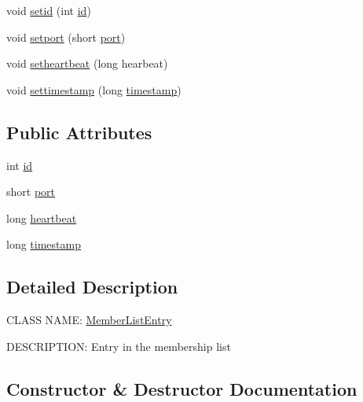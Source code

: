 \begin{DoxyCompactItemize}
\item 
void \hyperlink{class_member_list_entry_a7f5a04a841d491ef763cea6044a09ac1}{setid} (int \hyperlink{class_member_list_entry_a569594f798c011bec978d7de9af9e87c}{id})
\item 
void \hyperlink{class_member_list_entry_a4fd316a274905e869f091ac7cf384d7b}{setport} (short \hyperlink{class_member_list_entry_ae85ba26966dc188c7fec4c298fb47a81}{port})
\item 
void \hyperlink{class_member_list_entry_a08de1a1497e8930ddf823ba44f2a4d06}{setheartbeat} (long hearbeat)
\item 
void \hyperlink{class_member_list_entry_a963926fcfbe441fa4ddb1963ddff822d}{settimestamp} (long \hyperlink{class_member_list_entry_ae15f1e7b93b9f19be264930c783615cc}{timestamp})
\end{DoxyCompactItemize}
\subsection*{Public Attributes}
\begin{DoxyCompactItemize}
\item 
int \hyperlink{class_member_list_entry_a569594f798c011bec978d7de9af9e87c}{id}
\item 
short \hyperlink{class_member_list_entry_ae85ba26966dc188c7fec4c298fb47a81}{port}
\item 
long \hyperlink{class_member_list_entry_ae01ac985a9a529b0046bc463e97b9a52}{heartbeat}
\item 
long \hyperlink{class_member_list_entry_ae15f1e7b93b9f19be264930c783615cc}{timestamp}
\end{DoxyCompactItemize}


\subsection{Detailed Description}
C\+L\+A\+S\+S N\+A\+M\+E\+: \hyperlink{class_member_list_entry}{Member\+List\+Entry}

D\+E\+S\+C\+R\+I\+P\+T\+I\+O\+N\+: Entry in the membership list 

\subsection{Constructor \& Destructor Documentation}
\hypertarget{class_member_list_entry_ae96dafcf41fa55a43bbcb3f2a743e3bb}{}
